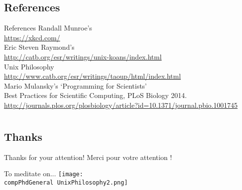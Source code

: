 \documentclass[]{beamer} %
\def\pathbase{/Users/pmxal9/} 	%
\def\pathbase{/Users/pmaal/} 	%
\edef\drop{\pathbase Dropbox/}		%
\edef\compPhdGeneral{\drop Nottingham/repos/phd/Seminars/ComputationalPhD/}
\begin{document}
\subsection{References}
\begin{frame}{References}
Randall Munroe's \\\url{https://xkcd.com/}\\[2mm]
Eric Steven Raymond's \\\url{http://catb.org/esr/writings/unix-koans/index.html}\\[2mm]
Unix Philosophy \\\url{http://www.catb.org/esr/writings/taoup/html/index.html}\\[2mm]
Mario Mulansky's `Programming for Scientists'\\[2mm]
Best Practices for Scientific Computing, PLoS Biology 2014. 
\url{http://journals.plos.org/plosbiology/article?id=10.1371/journal.pbio.1001745}
\end{frame}


\section[T]{}

\subsection{Thanks}
\begin{frame}{Thanks for your attention!}\centering
Merci pour votre attention !
\end{frame}


\begin{frame}{To meditate on...}\centering
\texttt{[image: \\compPhdGeneral UnixPhilosophy2.png]}
\end{frame}
\end{document}
